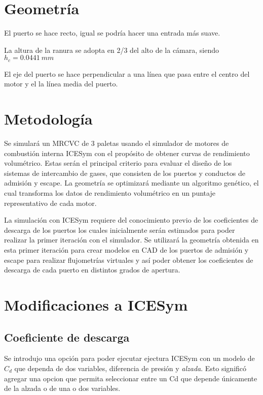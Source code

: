 \section{Geometría}
%
El puerto se hace recto, igual se podría hacer una entrada más suave.

La altura de la ranura se adopta en 2/3 del alto de la cámara, siendo $h_c=0.0441\ mm$

El eje del puerto se hace perpendicular a una línea que pasa entre el centro
del motor y el la línea media del puerto.


\section{Metodología}
%
Se simulará un MRCVC de 3 paletas usando el simulador de motores de combustión
interna ICESym \cite{icesym} con el propósito de obtener curvas de rendimiento
volumétrico.
%
Estas serán el principal criterio para evaluar el diseño de los sistemas de
intercambio de gases, que consisten de los puertos y conductos de admisión y
escape.
%
La geometría se optimizará mediante un algoritmo genético, el cual transforma
los datos de rendimiento volumétrico en un puntaje representativo de cada
motor.


La simulación con ICESym requiere del conocimiento previo de los coeficientes
de descarga de los puertos los cuales inicialmente serán estimados para poder
realizar la primer iteración con el simulador.
%
Se utilizará la geometría obtenida en esta primer iteración para crear modelos
en CAD de los puertos de admisión y escape para realizar flujometrías virtuales
y así poder obtener los coeficientes de descarga de cada puerto en distintos
grados de apertura.


\section{Modificaciones a ICESym} \subsection{Coeficiente de descarga}
%
Se introdujo una opción para poder ejecutar ejectura ICESym con un modelo de
$C_d$ que dependa de dos variables, diferencia de presión y \emph{alzada}.
%
Esto significó agregar una opcion que permita seleccionar entre un Cd que
depende únicamente de la alzada o de una o dos variables.

